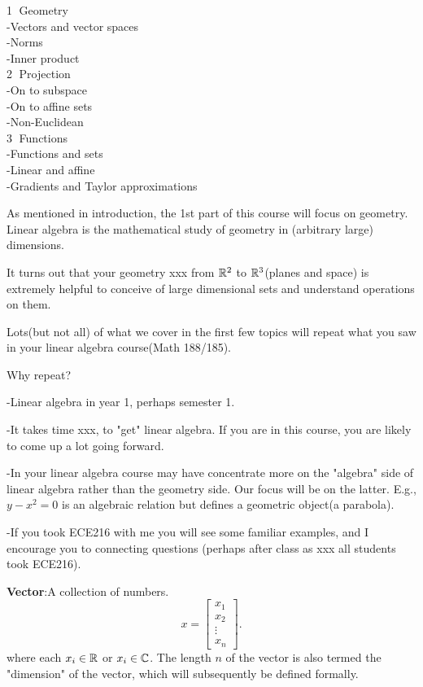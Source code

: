 
\noindent\textcircled{1} Geometry\\
-Vectors and vector spaces\\
-Norms\\
-Inner product\\

\noindent\textcircled{2} Projection\\
-On to subspace\\
-On to affine sets\\
-Non-Euclidean\\

\noindent\textcircled{3} Functions\\
-Functions and sets\\
-Linear and affine\\
-Gradients and Taylor approximations\\

\newpage

As mentioned in introduction, the 1st part of this course will focus on geometry. Linear algebra is the mathematical study of geometry in (arbitrary large) dimensions.

It turns out that your geometry xxx from $\mathbb{R}^{2}$ to $\mathbb{R}^{3}$(planes and space) is extremely helpful to conceive of large dimensional sets and understand operations on them.

Lots(but not all) of what we cover in the first few topics will repeat what you saw in your linear algebra course(Math 188/185).

\vspace{0.5cm}
\noindent Why repeat?

-Linear algebra in year 1, perhaps semester 1.

-It takes time xxx, to "get" linear algebra. If you are in this course, you are likely to come up a lot going forward.

-In your linear algebra course may have concentrate more on the "algebra" side of linear algebra rather than the geometry side. Our focus will be on the latter. E.g., $y-x^{2}=0$ is an algebraic relation but defines a geometric object(a parabola).

-If you took ECE216 with me you will see some familiar examples, and I encourage you to  connecting questions (perhaps after class as xxx all students took ECE216).

\newpage

\noindent\textbf{Vector}:A collection of numbers.
\begin{equation*}
x = \left[ \begin{array}{c} x_1 \\ x_2 \\ \vdots \\ x_n\end{array} \right].
\end{equation*}
where each $x_i \in \mathbb{R}$ or $x_i \in \mathbb{C}$. The length $n$ of the vector is also termed the "dimension" of the vector, which will subsequently be defined formally.

